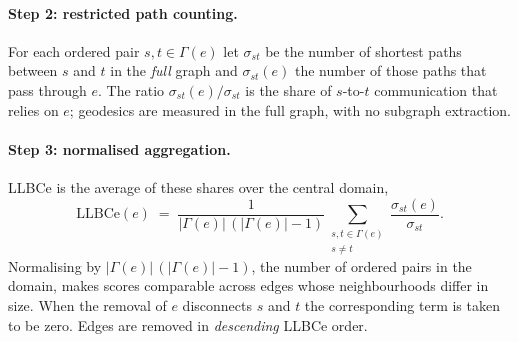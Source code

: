 \documentclass[runningheads,11pt]{article}
\begin{document}
\paragraph{Step 2: restricted path counting.}
For each ordered pair $s,t\in\Gamma(e)$ let $\sigma_{st}$ be the number of
shortest paths between $s$ and $t$ in the \emph{full} graph and $\sigma_{st}(e)$
the number of those paths that pass through $e$. The ratio
$\sigma_{st}(e)/\sigma_{st}$ is the share of $s$-to-$t$ communication that relies
on $e$; geodesics are measured in the full graph, with no subgraph extraction.

\paragraph{Step 3: normalised aggregation.}
LLBCe is the average of these shares over the central domain,
\begin{equation}
\mathrm{LLBCe}(e) \;=\;
\frac{1}{|\Gamma(e)|\,(|\Gamma(e)|-1)}
\sum_{\substack{s,t\in\Gamma(e)\\ s\neq t}}
\frac{\sigma_{st}(e)}{\sigma_{st}}.
\label{eq:llbce}
\end{equation}
Normalising by $|\Gamma(e)|\,(|\Gamma(e)|-1)$, the number of ordered pairs in
the domain, makes scores comparable across edges whose neighbourhoods differ in
size. When the removal of $e$ disconnects $s$ and $t$ the corresponding term is
taken to be zero. Edges are removed in \emph{descending} LLBCe order.
\end{document}

